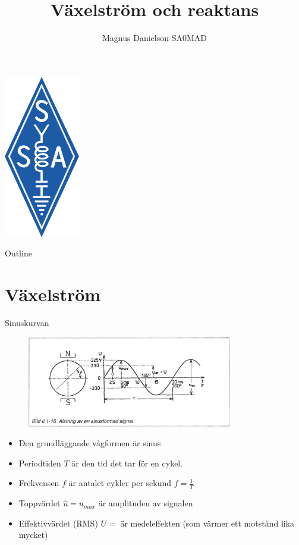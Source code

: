 \documentclass{beamer}
\title{Växelström och reaktans}
\author{Magnus Danielson SA0MAD}
\begin{document}
\begin{frame}
\titlepage
\includegraphics[height=0.3\textheight]{images/ssalogo}
\end{frame}

\begin{frame}{Outline}
\tableofcontents
\end{frame}

\section{Växelström}

\begin{frame}{Sinuskurvan}

\begin{figure}[h]
\includegraphics[width=0.8\textwidth]{images/bild_2_1-16}
\label{fig:BildII1-16}
\end{figure}

\begin{itemize}
\item Den grundläggande vågformen är sinus
\item Periodtiden $T$ är den tid det tar för en cykel.
\item Frekvensen $f$ är antalet cykler per sekund $f=\frac{1}{T}$
\item Toppvärdet $\hat{u}=u_{max}$ är amplituden av signalen
  \item Effektivvärdet (RMS) $U = $ är medeleffekten (som värmer ett motstånd lika mycket)
\end{itemize}
\end{frame}
\end{document}
